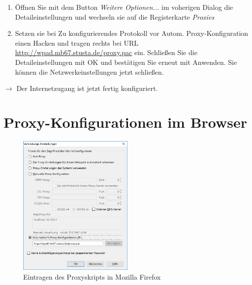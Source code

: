 \documentclass[a4paper,12pt]{scrartcl}
\begin{document}
\begin{enumerate}%
    \item Öffnen Sie mit dem Button \emph{Weitere Optionen...} im voherigen Dialog die Detaileinstellungen und wechseln sie auf die Registerkarte \emph{Proxies}
    \item Setzen sie bei Zu konfigurierendes Protokoll vor Autom. Proxy-Konfiguration einen Hacken und tragen rechts bei URL \url{http://wpad.mb67.stusta.de/proxy.pac} ein. Schließen Sie die Detaileinstellungen mit OK und bestätigen Sie erneut mit Anwenden. Sie können die Netzwerkeinstellungen jetzt schließen.
\end{enumerate}
$\rightarrow$ Der Internetzugang ist jetzt fertig konfiguriert.

\newpage

\section*{Proxy-Konfigurationen im Browser}
\label{Proxy}

\begin{figure}
  \vspace{-40pt}
  \begin{center}
    \includegraphics[width=0.5\textwidth,keepaspectratio]{Bilder/Proxy_Firefox}
  \end{center}
  \caption{Eintragen des Proxyskripts in Mozilla Firefox}
\end{figure}
\end{document}
